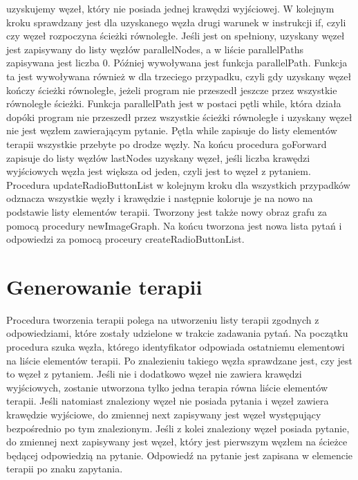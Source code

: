 \documentclass[oneside,a4paper]{book}
\begin{document}
\begin{spacing}{1.5}
uzyskujemy węzeł, który nie posiada jednej krawędzi wyjściowej. W kolejnym kroku sprawdzany jest dla uzyskanego węzła drugi warunek w instrukcji if, czyli czy węzeł rozpoczyna ścieżki równoległe. Jeśli jest on spełniony, uzyskany węzeł jest zapisywany do listy węzłów parallelNodes, a w liście parallelPaths zapisywana jest liczba 0. Później wywoływana jest funkcja parallelPath. Funkcja ta jest wywoływana również w dla trzeciego przypadku, czyli gdy uzyskany węzeł kończy ścieżki równoległe, jeżeli program nie przeszedł jeszcze przez wszystkie równoległe ścieżki. Funkcja parallelPath jest w postaci pętli while, która działa dopóki program nie przeszedł przez wszystkie ścieżki równoległe i uzyskany węzeł nie jest węzłem zawierającym pytanie. Pętla while zapisuje do listy elementów terapii wszystkie przebyte po drodze węzły. Na końcu procedura goForward zapisuje do listy węzłów lastNodes uzyskany węzeł, jeśli liczba krawędzi wyjściowych węzła jest większa od jeden, czyli jest to węzeł z pytaniem.
Procedura updateRadioButtonList w kolejnym kroku dla wszystkich przypadków odznacza wszystkie węzły i krawędzie i następnie koloruje je na nowo na podstawie listy elementów terapii. Tworzony jest także nowy obraz grafu za pomocą procedury newImageGraph. Na końcu tworzona jest nowa lista pytań i odpowiedzi za pomocą proceury createRadioButtonList. 

\section{Generowanie terapii}

Procedura tworzenia terapii polega na utworzeniu listy terapii zgodnych z odpowiedziami, które zostały udzielone w trakcie zadawania pytań. Na początku procedura szuka węzła, którego identyfikator odpowiada ostatniemu elementowi na liście elementów terapii. Po znalezieniu takiego węzła sprawdzane jest, czy jest to węzeł z pytaniem. Jeśli nie i dodatkowo węzeł nie zawiera krawędzi wyjściowych, zostanie utworzona tylko jedna terapia równa liście elementów terapii. Jeśli natomiast znaleziony węzeł nie posiada pytania i węzeł zawiera krawędzie wyjściowe, do zmiennej next zapisywany jest węzeł występujący bezpośrednio po tym znalezionym. Jeśli z kolei znaleziony węzeł posiada pytanie, do zmiennej next zapisywany jest węzeł, który jest pierwszym węzłem na ścieżce będącej odpowiedzią na pytanie. Odpowiedź na pytanie jest zapisana w elemencie terapii po znaku zapytania.


\end{spacing}
\end{document}
